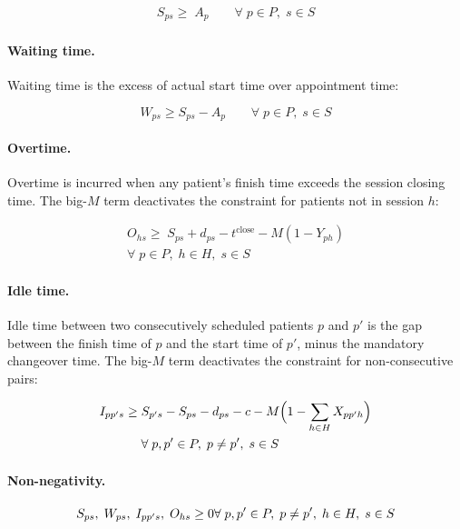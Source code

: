 \begin{align}
  S_{ps} \geq\; A_p
  \qquad \forall\; p \in P,\; s \in S
  \label{eq:rc_appt}
\end{align}

\paragraph{Waiting time.}
Waiting time is the excess of actual start time over appointment time:

\begin{equation}
  W_{ps} \geq S_{ps} - A_p
  \qquad \forall\; p \in P,\; s \in S
  \label{eq:rc_wait}
\end{equation}

\paragraph{Overtime.}
Overtime is incurred when any patient's finish time exceeds the session closing
time. The big-$M$ term deactivates the constraint for patients not in session
$h$:

\begin{align}
  O_{hs} \geq\; S_{ps} + d_{ps} - t^{\text{close}} - M(1 - Y_{ph}) \nonumber \\
  \forall\; p \in P,\; h \in H,\; s \in S
  \label{eq:rc_ot}
\end{align}

\paragraph{Idle time.}
Idle time between two consecutively scheduled patients $p$ and $p'$ is the
gap between the finish time of $p$ and the start time of $p'$, minus the
mandatory changeover time. The big-$M$ term deactivates the constraint for
non-consecutive pairs:

\begin{align}
  I_{pp's} \geq\; & S_{p's} - S_{ps} - d_{ps} - c
                  - M\Bigl(1 - \sum_{h \in H} X_{pp'h}\Bigr)
  \nonumber \\
  & \forall\; p, p' \in P,\; p \neq p',\; s \in S
  \label{eq:rc_idle}
\end{align}

\paragraph{Non-negativity.}

\begin{equation}
  S_{ps},\; W_{ps},\; I_{pp's},\; O_{hs} \geq 0 \\
  \forall\; p,p' \in P,\; p \neq p',\; h \in H,\; s \in S
  \label{eq:rc_nn}
\end{equation}

